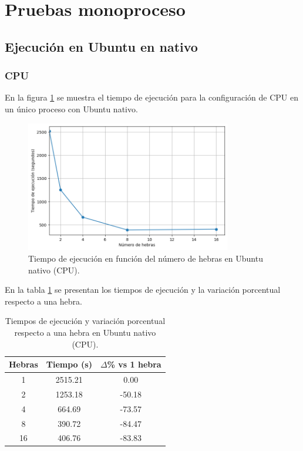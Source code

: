 \section{Pruebas monoproceso}

\subsection{Ejecución en Ubuntu en nativo}

\subsubsection{CPU}

En la figura \ref{fig:single-node_ubuntu_cpu_native_time} se muestra el tiempo de ejecución para la configuración de CPU en un único proceso con Ubuntu nativo.

\begin{figure}[H]
    \centering
    \includegraphics[width=0.8\textwidth]{imagenes/cap5/single-node_ubuntu_cpu_native_time.png}
    \caption{Tiempo de ejecución en función del número de hebras en Ubuntu nativo (CPU).}
    \label{fig:single-node_ubuntu_cpu_native_time}
\end{figure}

En la tabla \ref{tab:single-node_ubuntu_cpu_native} se presentan los tiempos de ejecución y la variación porcentual respecto a una hebra.

\begin{table}[ht]
    \centering
    \begin{tabular}{|c|c|c|}
        \hline
        \textbf{Hebras} & \textbf{Tiempo (s)} & \textbf{$\Delta$\% vs 1 hebra} \\
        \hline
        1               & 2515.21             & 0.00                           \\
        2               & 1253.18             & -50.18                         \\
        4               & 664.69              & -73.57                         \\
        8               & 390.72              & -84.47                         \\
        16              & 406.76              & -83.83                         \\
        \hline
    \end{tabular}
    \caption{Tiempos de ejecución y variación porcentual respecto a una hebra en Ubuntu nativo (CPU).}
    \label{tab:single-node_ubuntu_cpu_native}
\end{table}

